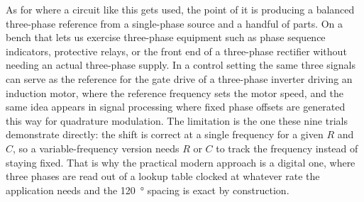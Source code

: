 \documentclass[11pt]{article}
\begin{document}
As for where a circuit like this gets used, the point of it is producing a
balanced three-phase reference from a single-phase source and a handful of parts.
On a bench that lets us exercise three-phase equipment such as phase sequence
indicators, protective relays, or the front end of a three-phase rectifier
without needing an actual three-phase supply. In a control setting the same
three signals can serve as the reference for the gate drive of a three-phase
inverter driving an induction motor, where the reference frequency sets the motor
speed, and the same idea appears in signal processing where fixed phase offsets
are generated this way for quadrature modulation. The limitation is the one these
nine trials demonstrate directly: the shift is correct at a single frequency for
a given $R$ and $C$, so a variable-frequency version needs $R$ or $C$ to track
the frequency instead of staying fixed. That is why the practical modern approach
is a digital one, where three phases are read out of a lookup table clocked at
whatever rate the application needs and the \qty{120}{\degree} spacing is exact
by construction.

\end{document}
